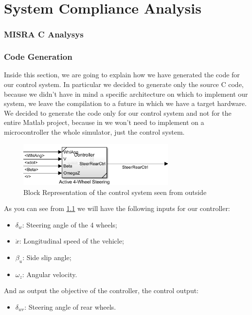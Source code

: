 
\chapter{System Compliance Analysis}

\subsection{MISRA C Analysys}

\subsection{Code Generation}
Inside this section, we are going to explain how we have generated the code for our control system. In particular we decided to generate only the source C code, because we didn't have in mind a specific architecture on which to implement our system, we leave the compilation to a future in which we have a target hardware. We decided to generate the code only for our control system and not for the entire Matlab project, because in we won't need to implement on a microcontroller the whole simulator, just the control system. 
\begin{figure} \label{Control Mask}
		\centering
		\includegraphics[width=0.7\textwidth]{Images/Simulator/ctrl-mask}
		\caption{Block Representation of the control system seen from outside}	
\end{figure}
As you can see from \ref{Control Mask} we will have the following inputs for our controller:
\begin{itemize}
\item $\delta_{w}$: Steering angle of the 4 wheels;
\item $\dot{x}$: Longitudinal speed of the vehicle;
\item $\beta_{u}$: Side slip angle;
\item $\omega_{z}$: Angular velocity.
\end{itemize}
And as output the objective of the controller, the control output:
\begin{itemize}
\item $\delta_{wr}$: Steering angle of rear wheels.
\end{itemize}
